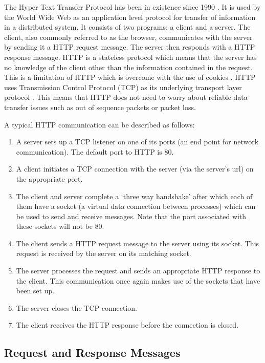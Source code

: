 \documentclass[10pt,twocolumn]{witseiepaper}
\begin{document}
The Hyper Text Transfer Protocol has been in existence since 1990 \cite{rfc7230}. It is used by the World Wide Web as an application level protocol for transfer of information in a distributed system. It consists of two programs: a client and a server. The client, also commonly referred to as the browser, communicates with the server by sending it a HTTP request message. The server then responds with a HTTP response message. HTTP is a stateless protocol which means that the server has no knowledge of the client other than the information contained in the request. This is a limitation of HTTP which is overcome with the use of cookies \cite{kurose}. HTTP uses Transmission Control Protocol (TCP) as its underlying transport layer protocol \cite{kurose}. This means that HTTP does not need to worry about reliable data transfer issues such as out of sequence packets or packet loss.  

A typical HTTP communication can be described as follows: 
\begin{enumerate}
	\item A server sets up a TCP listener on one of its ports (an end point for network communication). The default port to HTTP is 80. 
	\item A client initiates a TCP connection with the server (via the server's url) on the appropriate port. 
	\item The client and server complete a `three way handshake' after which each of them have a socket (a virtual data connection between processes) which can be used to send and receive messages. Note that the port associated with these sockets will not be 80.
	\item The client sends a HTTP request message to the server using its socket. This request is received by the server on its matching socket.
	\item The server processes the request and sends an appropriate HTTP response to the client. This communication once again makes use of the sockets that have been set up. 
	\item The server closes the TCP connection.
	\item The client receives the HTTP response before the connection is closed.
\end{enumerate}

	\subsection{Request and Response Messages} \label{formats}
\end{document}
